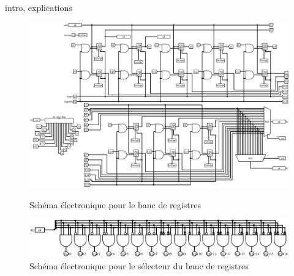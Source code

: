 \paragraph{}{
	intro, explications
}

\begin{figure}
	\centering
	\includegraphics[scale=0.3,angle=90,origin=c]{circuits/banc_reg.png}
	\label{banc_reg_circ}
	\caption{Sch\'{e}ma \'{e}lectronique pour le banc de registres}
\end{figure}

\begin{figure}
	\centering
	\includegraphics[scale=0.3,origin=c]{circuits/banc_reg_selec.png}
	\caption{
		\label{banc_reg_selec_circ}
		Sch\'{e}ma \'{e}lectronique pour le sélecteur du banc de registres
	}
\end{figure}